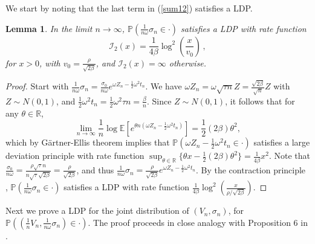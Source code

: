 \documentclass[11pt]{article}
\numberwithin{equation}{section}
\theoremstyle{plain}
\newtheorem{lemma}[theorem]{Lemma}
\begin{document}

We start by noting that the last term in (\ref{sum12}) satisfies a LDP. 

\begin{lemma}\label{prop:2}
In the limit $n\to \infty$,
$\mathbb{P}(\frac{1}{n\omega} \sigma_n \in \cdot)$ satisfies a LDP
with rate function
\begin{equation}\label{I2}
\mathcal{I}_2(x) = \frac{1}{4\beta} \log^2 \left(\frac{x}{v_0}\right)\,,
\end{equation}
for $x>0$, with $v_0 = \frac{\rho}{\sqrt{2\beta}}$, and $\mathcal{I}_2(x)=\infty$
otherwise.
\end{lemma}

\begin{proof}
Start with $\frac{1}{n\omega} \sigma_n =\frac{\sigma_0}{n\omega} e^{\omega Z_n-\frac12
\omega^2 t_n}$.
We have $\omega Z_n = \omega \sqrt{\tau n} Z=\frac{\sqrt{2\beta}}{\sqrt{n}}Z$ with $Z\sim N(0,1)$,
and $\frac{1}{2}\omega^{2}t_{n}=\frac{1}{2}\omega^{2}\tau n=\frac{\beta}{n}$.
Since $Z\sim N(0,1)$, it follows that for any $\theta\in\mathbb{R}$,
\begin{equation}
\lim_{n\rightarrow\infty}\frac{1}{n}\log\mathbb{E}\left[e^{\theta n(\omega Z_n-\frac12
\omega^2 t_n)}\right]
=\frac{1}{2}(2\beta)\theta^{2},
\end{equation}
which by G\"{a}rtner-Ellis theorem \cite{Dembo} implies that
$\mathbb{P}(\omega Z_n-\frac12
\omega^2 t_n\in\cdot)$ satisfies a large deviation principle
with rate function $\sup_{\theta\in\mathbb{R}}\{\theta x-\frac{1}{2}(2\beta)\theta^{2}\}
=\frac{1}{4\beta}x^{2}$. 
Note that 
$\frac{\sigma_{0}}{n\omega} =\frac{\rho\sqrt{\tau}n}{n\sqrt{\tau}\sqrt{2\beta}}=\frac{\rho}{\sqrt{2\beta}}$,
and thus $\frac{1}{n\omega}\sigma_{n}=\frac{\rho}{\sqrt{2\beta}}e^{\omega Z_{n}-\frac{1}{2}\omega^{2}t_{n}}$.
By the contraction principle \cite{Dembo},
$\mathbb{P}(\frac{1}{n\omega} \sigma_n \in \cdot)$ satisfies a LDP
with rate function $\frac{1}{4\beta}\log^{2}(\frac{x}{\rho/\sqrt{2\beta}})$. 
\end{proof}


Next we prove a LDP for the joint 
distribution of $(V_n,\sigma_{n})$,
for $\mathbb{P}((\frac{1}{n} V_n, \frac{1}{n\omega} \sigma_{n}) \in \cdot )$.
The proof proceeds in close analogy with Proposition 6 in \cite{PZDiscreteAsian}.
\end{document}
